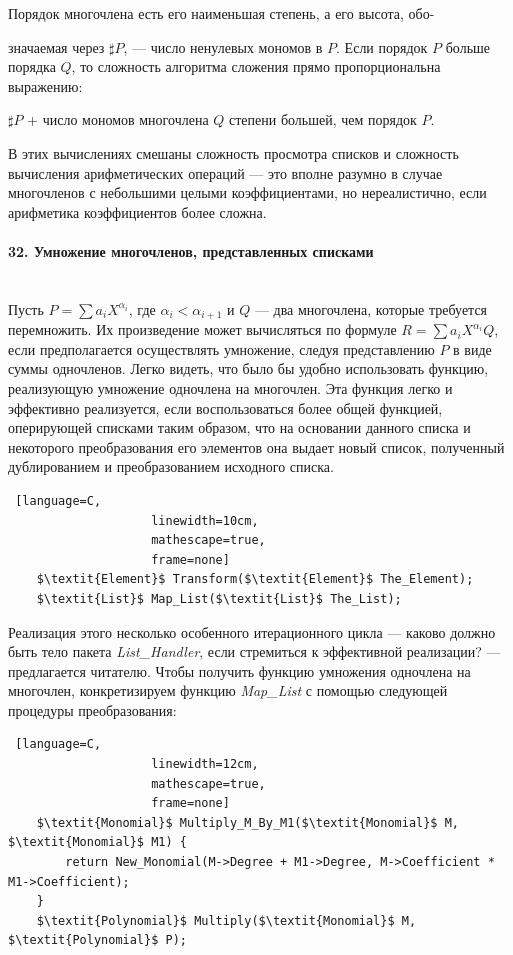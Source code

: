 \documentclass{../../template/mai_book}
\begin{document}

Порядок многочлена есть его наименьшая степень, а его высота, обо- \linebreak

\newpage


\noindent
значаемая через $\sharp P$, — число ненулевых мономов в $P$. Если порядок $P$ больше порядка $Q$, то сложность алгоритма сложения прямо пропорциональна выражению:

\begin{center}
$\sharp P$ + число мономов многочлена $Q$ степени большей, чем порядок $P$.
\end{center}

\noindent
В этих вычислениях смешаны сложность просмотра списков и сложность вычисления арифметических операций — это вполне разумно в случае многочленов с небольшими целыми коэффициентами, но нереалистично, если арифметика коэффициентов более сложна.

\paragraph{32. Умножение многочленов, представленных списками} \mbox{}\\

Пусть $P = \sum a_i X^{\alpha_i}$, где $\alpha_i < \alpha_{i + 1}$ и $Q$ — два многочлена, которые требуется перемножить. Их произведение может вычисляться по формуле $R = \sum a_i X^{\alpha_i}Q$, если предполагается осуществлять умножение, следуя представлению $P$ в виде суммы одночленов. Легко видеть, что было бы удобно использовать функцию, реализующую умножение одночлена на многочлен. Эта функция легко и эффективно  реализуется, если воспользоваться более общей функцией, оперирующей списками таким образом, что на основании данного списка и некоторого преобразования его элементов она выдает новый список, полученный дублированием и преобразованием исходного списка.

\begin{lstlisting} [language=C,
					linewidth=10cm,
					mathescape=true,
					frame=none]
	$\textit{Element}$ Transform($\textit{Element}$ The_Element);
	$\textit{List}$ Map_List($\textit{List}$ The_List);
\end{lstlisting}

Реализация этого несколько особенного итерационного цикла — каково должно быть тело пакета \textit{List\_Handler}, если стремиться к эффективной реализации? — предлагается читателю. Чтобы получить функцию умножения одночлена на многочлен, конкретизируем функцию \textit{Map\_List} с помощью следующей процедуры преобразования:

\begin{lstlisting} [language=C,
					linewidth=12cm,
					mathescape=true,
					frame=none]
	$\textit{Monomial}$ Multiply_M_By_M1($\textit{Monomial}$ M, $\textit{Monomial}$ M1) {
		return New_Monomial(M->Degree + M1->Degree, M->Coefficient * M1->Coefficient);
	}
	$\textit{Polynomial}$ Multiply($\textit{Monomial}$ M, $\textit{Polynomial}$ P);
\end{lstlisting}
\end{document}
